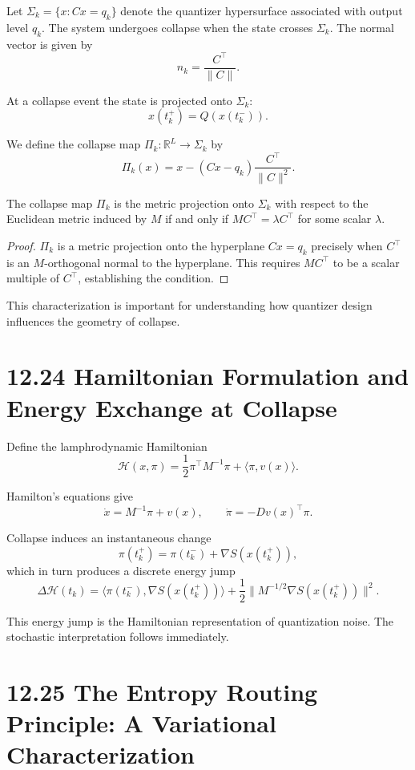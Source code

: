 Let $\Sigma_k = \{ x : Cx = q_k \}$ denote the quantizer hypersurface associated with output level $q_k$. The system undergoes collapse when the state crosses $\Sigma_k$. The normal vector is given by
\[
n_k = \frac{C^\top}{\|C\|}.
\]

At a collapse event the state is projected onto $\Sigma_k$:
\[
x(t_k^+) = Q(x(t_k^-)).
\]

We define the collapse map $\Pi_k : \mathbb{R}^{L} \to \Sigma_k$ by
\[
\Pi_k(x) = x - (Cx - q_k)\frac{C^\top}{\|C\|^{2}}.
\]

\begin{theorem}
The collapse map $\Pi_k$ is the metric projection onto $\Sigma_k$ with respect to the Euclidean metric induced by $M$ if and only if $MC^\top = \lambda C^\top$ for some scalar $\lambda$.
\end{theorem}

\begin{proof}
$\Pi_k$ is a metric projection onto the hyperplane $Cx = q_k$ precisely when $C^\top$ is an $M$-orthogonal normal to the hyperplane. This requires $M C^\top$ to be a scalar multiple of $C^\top$, establishing the condition.
\end{proof}

This characterization is important for understanding how quantizer design influences the geometry of collapse.

\section*{12.24 Hamiltonian Formulation and Energy Exchange at Collapse}

Define the lamphrodynamic Hamiltonian
\[
\mathcal{H}(x,\pi) = \frac{1}{2} \pi^\top M^{-1} \pi + \langle \pi, v(x) \rangle.
\]

Hamilton’s equations give
\[
\dot{x} = M^{-1} \pi + v(x), \qquad \dot{\pi} = - Dv(x)^\top \pi.
\]

Collapse induces an instantaneous change
\[
\pi(t_k^+) = \pi(t_k^-) + \nabla S(x(t_k^+)),
\]
which in turn produces a discrete energy jump
\[
\Delta \mathcal{H}(t_k) =
\langle \pi(t_k^-), \nabla S(x(t_k^+)) \rangle
+ \frac{1}{2} \| M^{-1/2}\nabla S(x(t_k^+)) \|^{2}.
\]

This energy jump is the Hamiltonian representation of quantization noise. The stochastic interpretation follows immediately.

\section*{12.25 The Entropy Routing Principle: A Variational Characterization}

